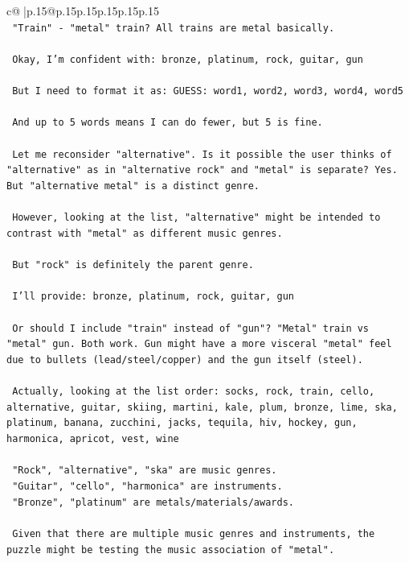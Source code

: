 \documentclass{article}
\begin{document}
{\begin{supertabular}{c@{$\;$}|p{.15\linewidth}@{}p{.15\linewidth}p{.15\linewidth}p{.15\linewidth}p{.15\linewidth}p{.15\linewidth}}
{{{\\ 
\texttt{ "Train" {-} "metal" train? All trains are metal basically.} \\
\\ 
\texttt{ Okay, I'm confident with: bronze, platinum, rock, guitar, gun} \\
\\ 
\texttt{ But I need to format it as: GUESS: word1, word2, word3, word4, word5} \\
\\ 
\texttt{ And up to 5 words means I can do fewer, but 5 is fine.} \\
\\ 
\texttt{ Let me reconsider "alternative". Is it possible the user thinks of "alternative" as in "alternative rock" and "metal" is separate? Yes. But "alternative metal" is a distinct genre.} \\
\\ 
\texttt{ However, looking at the list, "alternative" might be intended to contrast with "metal" as different music genres.} \\
\\ 
\texttt{ But "rock" is definitely the parent genre.} \\
\\ 
\texttt{ I'll provide: bronze, platinum, rock, guitar, gun} \\
\\ 
\texttt{ Or should I include "train" instead of "gun"? "Metal" train vs "metal" gun. Both work. Gun might have a more visceral "metal" feel due to bullets (lead/steel/copper) and the gun itself (steel).} \\
\\ 
\texttt{ Actually, looking at the list order: socks, rock, train, cello, alternative, guitar, skiing, martini, kale, plum, bronze, lime, ska, platinum, banana, zucchini, jacks, tequila, hiv, hockey, gun, harmonica, apricot, vest, wine} \\
\\ 
\texttt{ "Rock", "alternative", "ska" are music genres.} \\
\texttt{ "Guitar", "cello", "harmonica" are instruments.} \\
\texttt{ "Bronze", "platinum" are metals/materials/awards.} \\
\\ 
\texttt{ Given that there are multiple music genres and instruments, the puzzle might be testing the music association of "metal".} \\
\\ 
}}}
\end{supertabular}}
\end{document}
